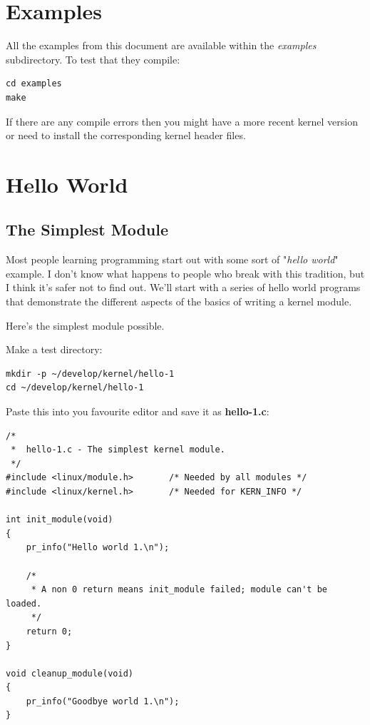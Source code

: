 \documentclass[11pt]{article}
\begin{document}
\section*{Examples}
\label{sec:org982837d}
All the examples from this document are available within the \emph{examples} subdirectory. To test that they compile:

\begin{verbatim}
cd examples
make
\end{verbatim}

If there are any compile errors then you might have a more recent kernel version or need to install the corresponding kernel header files.
\section*{Hello World}
\label{sec:org2f356ff}
\subsection*{The Simplest Module}
\label{sec:orgc496296}
Most people learning programming start out with some sort of "\emph{hello world}" example. I don't know what happens to people who break with this tradition, but I think it's safer not to find out. We'll start with a series of hello world programs that demonstrate the different aspects of the basics of writing a kernel module.

Here's the simplest module possible.

Make a test directory:

\begin{verbatim}
mkdir -p ~/develop/kernel/hello-1
cd ~/develop/kernel/hello-1
\end{verbatim}

Paste this into you favourite editor and save it as \textbf{hello-1.c}:

\begin{verbatim}
/*
 *  hello-1.c - The simplest kernel module.
 */
#include <linux/module.h>       /* Needed by all modules */
#include <linux/kernel.h>       /* Needed for KERN_INFO */

int init_module(void)
{
    pr_info("Hello world 1.\n");

    /*
     * A non 0 return means init_module failed; module can't be loaded.
     */
    return 0;
}

void cleanup_module(void)
{
    pr_info("Goodbye world 1.\n");
}
\end{verbatim}
\end{document}
